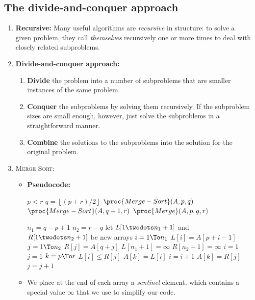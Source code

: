 \documentclass{report}
\newcommand{\floor}[1]{\left\lfloor #1 \right\rfloor}
\begin{document}
\subsection{The divide-and-conquer approach}
\begin{enumerate}
    \item \textbf{Recursive:} Many useful algorithms are \emph{recursive} in structure: to solve a given problem, they call \emph{themselves} recursively one or more times to deal with closely related subproblems.
    \item \textbf{Divide-and-conquer approach:}
    \begin{enumerate}
        \item \textbf{Divide} the problem into a number of subproblems that are smaller instances of the same problem.
        \item \textbf{Conquer} the subproblems by solving them recursively. If the subproblem sizes are small enough, however, just solve the subproblems in a straightforward manner.
        \item \textbf{Combine} the solutions to the subproblems into the solution for the original problem.
    \end{enumerate}
    \item \textsc{Merge Sort:}
    \begin{itemize}
        \item \textbf{Pseudocode:} 
        \begin{codebox}
         \label{alg:merge-sort}
        \li \If $p < r$
            \Then 
        \li     $q = \floor{(p+r)/2}$
        \li     $\proc{Merge-Sort}(A,p,q)$
        \li     $\proc{Merge-Sort}(A,q+1,r)$
        \li     $\proc{Merge}(A,p,q,r)$
            \End
        \end{codebox}
        \begin{codebox}
        \li $n_1 = q-p+1$
        \li $n_2 = r-q$
        \li let $L[1 \twodots n_1 + 1]$ and $R[1 \twodots n_2 + 1]$ be new arrays 
        \li \For $i = 1 \To n_1$
            \Do 
        \li     $L[i] = A[p+i-1]$
            \End 
        \li \For $j = 1 \To n_2$ 
            \Do 
        \li     $R[j] = A[q+j]$
            \End 
        \li $L[n_1 + 1] = \infty$ 
        \li $R[n_2 + 1] = \infty$
        \li $i = 1$
        \li $j = 1$
        \li \For $k = p \To r$
            \Do
        \li     \If $L[i] \leq R[j]$
                \Then 
        \li         $A[k] = L[i]$
        \li         $i = i+1$
        \li     \Else $A[k] = R[j]$
        \li         $j = j+1$
                \End
            \End
        \end{codebox}
        \item We place at the end of each array a \emph{sentinel} element, which contains a special value $\infty$ that we use to simplify our code.
    \end{itemize}
\end{enumerate}
\end{document}
